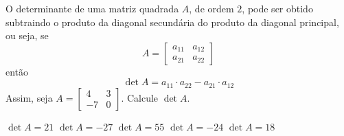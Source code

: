O determinante de uma matriz quadrada $A$, de ordem $2$, pode ser obtido subtraindo o produto da diagonal secundária do produto da diagonal principal, ou seja, se
\[A = \left[ \begin{array}{cc}
a_{11}  &   a_{12}\\
a_{21}   & a_{22}
\end{array} \right]\]
então
\[\det A=a_{11}\cdot a_{22}-a_{21}\cdot a_{12}\]
Assim, seja $A = \left[ \begin{array}{cc}
4  &   3\\
-7  &   0
\end{array} \right]$. Calcule $\det A$.

$\det A=21$
$\det A=-27$
$\det A=55$
$\det A=-24$
$\det A=18$


